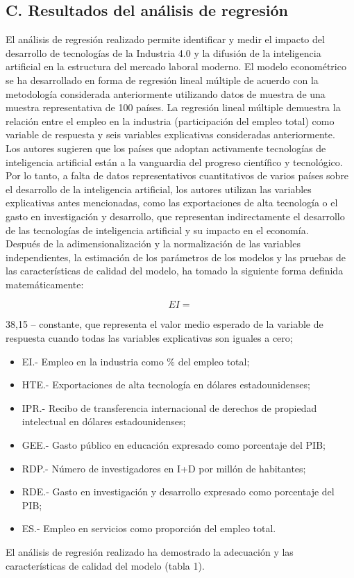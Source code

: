 \subsection*{C. Resultados del análisis de regresión}
El análisis de regresión realizado permite identificar y medir el impacto del desarrollo de tecnologías de la Industria 4.0 y la difusión de la inteligencia artificial en la estructura del mercado laboral moderno. El modelo econométrico se ha desarrollado en forma de regresión lineal múltiple de acuerdo con la metodología considerada anteriormente utilizando datos de muestra de una muestra representativa de 100 países. La regresión lineal múltiple demuestra la relación entre el empleo en la industria (participación del empleo total) como variable de respuesta y seis variables explicativas consideradas anteriormente.\\

Los autores sugieren que los países que adoptan activamente tecnologías de inteligencia artificial están a la vanguardia del progreso científico y tecnológico. Por lo tanto, a falta de datos representativos cuantitativos de varios países sobre el desarrollo de la inteligencia artificial, los autores utilizan las variables explicativas antes mencionadas, como las exportaciones de alta tecnología o el gasto en investigación y desarrollo, que representan indirectamente el desarrollo de las tecnologías de inteligencia artificial y su impacto en el economía.\\

Después de la adimensionalización y la normalización de las variables independientes, la estimación de los parámetros de los modelos y las pruebas de las características de calidad del modelo, ha tomado la siguiente forma definida matemáticamente:

$$EI = $$

38,15 – constante, que representa el valor medio esperado de la variable de respuesta cuando todas las variables explicativas son iguales a cero;

\begin{itemize}
    \item EI.- Empleo en la industria como $\%$ del empleo total; 
    \item HTE.-  Exportaciones de alta tecnología en dólares estadounidenses; 
    \item IPR.- Recibo de transferencia internacional de derechos de propiedad intelectual en dólares estadounidenses; 
    \item GEE.- Gasto público en educación expresado como porcentaje del PIB; 
    \item RDP.- Número de investigadores en I+D por millón de habitantes; 
    \item RDE.- Gasto en investigación y desarrollo expresado como porcentaje del PIB; 
    \item ES.- Empleo en servicios como proporción del empleo total. 
\end{itemize}
	El análisis de regresión realizado ha demostrado la adecuación y las características de calidad del modelo (tabla 1).\\

